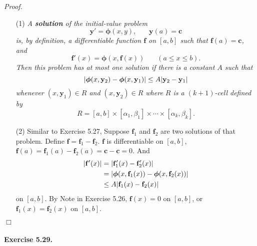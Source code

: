 \documentclass{article}
\begin{document}
\emph{Proof.}
\begin{enumerate}
\item[(1)]
\emph{A \textbf{solution} of the initial-value problem
\[
  \mathbf{y}' = \bm{\phi}(x,y), \:\:\:\:\:\:\:\:
  \mathbf{y}(a) = \mathbf{c}
\]
is, by definition, a differentiable function $\mathbf{f}$ on $[a,b]$
such that $\mathbf{f}(a) = \mathbf{c}$, and
\[
  \mathbf{f}'(x) = \bm{\phi}(x,\mathbf{f}(x)) \:\:\:\:\:\:\:\: (a \leq x \leq b).
\]
Then this problem has at most one solution if there is a constant $A$ such that
\[
  \abs{ \bm{\phi}(x,\mathbf{y}_2) - \bm{\phi}(x,\mathbf{y}_1) }
  \leq A \abs{ \mathbf{y}_2 - \mathbf{y}_1 }
\]
whenever $(x,\mathbf{y}_1) \in R$ and $(x,\mathbf{y}_2) \in R$
where $R$ is a $(k+1)$-cell defined by
\[
  R = [a,b] \times [\alpha_1,\beta_1] \times \cdots \times [\alpha_k,\beta_k].
\]}
\item[(2)]
Similar to Exercise 5.27,
Suppose $\mathbf{f}_1$ and $\mathbf{f}_2$ are two solutions of that problem.
Define $\mathbf{f} = \mathbf{f}_1 - \mathbf{f}_2$.
$\mathbf{f}$ is differentiable on $[a,b]$,
$\mathbf{f}(a) = \mathbf{f}_1(a) - \mathbf{f}_2(a) = \mathbf{c} - \mathbf{c} = 0$.
And
\begin{align*}
  |\mathbf{f}'(x)|
  &= |\mathbf{f}_1'(x) - \mathbf{f}_2'(x)| \\
  &= \abs{ \bm{\phi}(x,\mathbf{f}_1(x)) - \bm{\phi}(x,\mathbf{f}_2(x)) } \\
  &\leq A | \mathbf{f}_1(x) - \mathbf{f}_2(x) |
\end{align*}
on $[a,b]$.
By Note in Exercise 5.26,
$\mathbf{f}(x) = 0$ on $[a,b]$, or $\mathbf{f}_1(x) = \mathbf{f}_2(x)$ on $[a,b]$.
\end{enumerate}
$\Box$ \\\\






\textbf{Exercise 5.29.}



\end{document}
